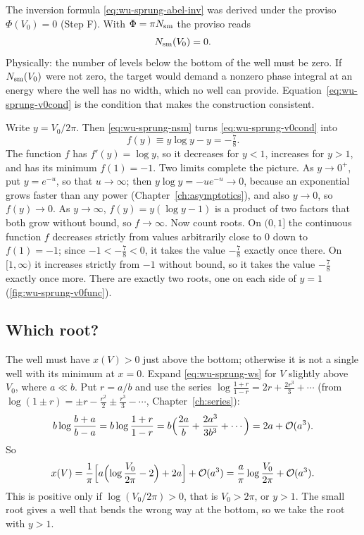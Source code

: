 The inversion formula \eqref{eq:wu-sprung-abel-inv} was derived under the proviso $\Phi(V_0)=0$ (Step F). With $\Phi=\pi N_{\mathrm{sm}}$ the proviso reads
\begin{equation}
N_{\mathrm{sm}}(V_0)=0 .
\label{eq:wu-sprung-v0cond}
\end{equation}
Physically: the number of levels below the bottom of the well must be zero. If $N_{\mathrm{sm}}(V_0)$ were not zero, the target would demand a nonzero phase integral at an energy where the well has no width, which no well can provide. Equation~\eqref{eq:wu-sprung-v0cond} is the condition that makes the construction consistent.

Write $y=V_0/2\pi$. Then \eqref{eq:wu-sprung-nsm} turns \eqref{eq:wu-sprung-v0cond} into
\begin{equation}
f(y)\equiv y\log y-y=-\tfrac78 .
\label{eq:wu-sprung-fy}
\end{equation}
The function $f$ has $f'(y)=\log y$, so it decreases for $y<1$, increases for $y>1$, and has its minimum $f(1)=-1$. Two limits complete the picture. As $y\to0^+$, put $y=e^{-u}$, so that $u\to\infty$; then $y\log y=-ue^{-u}\to0$, because an exponential grows faster than any power (Chapter~\ref{ch:asymptotics}), and also $y\to0$, so $f(y)\to0$. As $y\to\infty$, $f(y)=y(\log y-1)$ is a product of two factors that both grow without bound, so $f\to\infty$. Now count roots. On $(0,1]$ the continuous function $f$ decreases strictly from values arbitrarily close to $0$ down to $f(1)=-1$; since $-1<-\tfrac78<0$, it takes the value $-\tfrac78$ exactly once there. On $[1,\infty)$ it increases strictly from $-1$ without bound, so it takes the value $-\tfrac78$ exactly once more. There are exactly two roots, one on each side of $y=1$ (\cref{fig:wu-sprung-v0func}).

\subsection{Which root?}

The well must have $x(V)>0$ just above the bottom; otherwise it is not a single well with its minimum at $x=0$. Expand \eqref{eq:wu-sprung-ws} for $V$ slightly above $V_0$, where $a\ll b$. Put $r=a/b$ and use the series $\log\frac{1+r}{1-r}=2r+\frac{2r^3}{3}+\cdots$ (from $\log(1\pm r)=\pm r-\frac{r^2}2\pm\frac{r^3}3-\cdots$, Chapter~\ref{ch:series}):
\[
b\log\frac{b+a}{b-a}=b\log\frac{1+r}{1-r}=b\Bigl(\frac{2a}{b}+\frac{2a^3}{3b^3}+\cdots\Bigr)=2a+\mathcal{O}(a^3).
\]
So
\begin{equation}
x(V)=\frac1\pi\Bigl[a\Bigl(\log\frac{V_0}{2\pi}-2\Bigr)+2a\Bigr]+\mathcal{O}(a^3)=\frac{a}{\pi}\log\frac{V_0}{2\pi}+\mathcal{O}(a^3).
\label{eq:wu-sprung-bottom}
\end{equation}
This is positive only if $\log(V_0/2\pi)>0$, that is $V_0>2\pi$, or $y>1$. The small root gives a well that bends the wrong way at the bottom, so we take the root with $y>1$.

